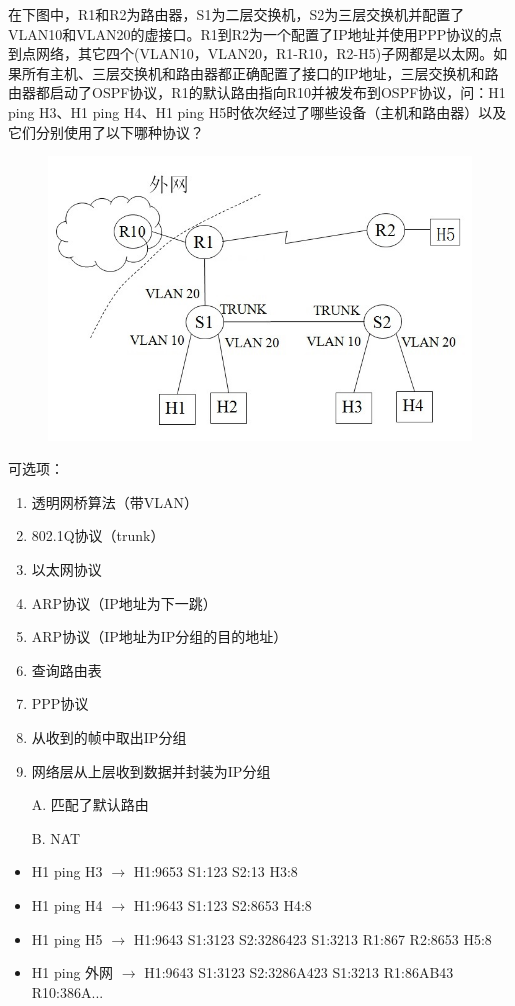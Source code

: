 \begin{example}[综合题]
	在下图中，R1和R2为路由器，S1为二层交换机，S2为三层交换机并配置了VLAN10和VLAN20的虚接口。R1到R2为一个配置了IP地址并使用PPP协议的点到点网络，其它四个(VLAN10，VLAN20，R1-R10，R2-H5)子网都是以太网。如果所有主机、三层交换机和路由器都正确配置了接口的IP地址，三层交换机和路由器都启动了OSPF协议，R1的默认路由指向R10并被发布到OSPF协议，问：H1 ping H3、H1 ping H4、H1 ping H5时依次经过了哪些设备（主机和路由器）以及它们分别使用了以下哪种协议？
	\begin{figure}[H]
		\centering
		\includegraphics[width=0.6\linewidth]{fig/route_all_example.jpg}
	\end{figure}
	可选项：
	\begin{enumerate}
\item 透明网桥算法（带VLAN）
\item 802.1Q协议（trunk）
\item 以太网协议
\item ARP协议（IP地址为下一跳）
\item ARP协议（IP地址为IP分组的目的地址）
\item 查询路由表
\item PPP协议
\item 从收到的帧中取出IP分组
\item 网络层从上层收到数据并封装为IP分组
\item [A.] 匹配了默认路由
\item [B.] NAT
	\end{enumerate}
\end{example}
\begin{analysis}
	\begin{itemize}
		\item H1 ping H3 $\to$ H1:9653  S1:123   S2:13  H3:8
		\item H1 ping H4 $\to$ H1:9643  S1:123   S2:8653 H4:8
		\item H1 ping H5 $\to$ H1:9643  S1:3123   S2:3286423 S1:3213 R1:867 R2:8653 H5:8
		\item H1 ping 外网 $\to$ H1:9643  S1:3123   S2:3286A423 S1:3213 R1:86AB43 R10:386A...
	\end{itemize}
\end{analysis}

